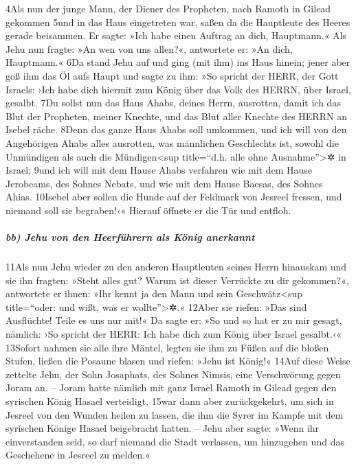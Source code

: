 4Als nun der junge Mann, der Diener des Propheten, nach Ramoth in Gilead
gekommen 5und in das Haus eingetreten war, saßen da die Hauptleute des
Heeres gerade beisammen. Er sagte: »Ich habe einen Auftrag an dich,
Hauptmann.« Als Jehu nun fragte: »An wen von uns allen?«, antwortete er:
»An dich, Hauptmann.« 6Da stand Jehu auf und ging (mit ihm) ins Haus
hinein; jener aber goß ihm das Öl aufs Haupt und sagte zu ihm: »So
spricht der HERR, der Gott Israels: ›Ich habe dich hiermit zum König
über das Volk des HERRN, über Israel, gesalbt. 7Du sollst nun das Haus
Ahabs, deines Herrn, ausrotten, damit ich das Blut der Propheten, meiner
Knechte, und das Blut aller Knechte des HERRN an Isebel räche. 8Denn das
ganze Haus Ahabs soll umkommen, und ich will von den Angehörigen Ahabs
alles ausrotten, was männlichen Geschlechts ist, sowohl die Unmündigen
als auch die Mündigen\textless sup title=``d.h. alle ohne
Ausnahme''\textgreater✲ in Israel; 9und ich will mit dem Hause Ahabs
verfahren wie mit dem Hause Jerobeams, des Sohnes Nebats, und wie mit
dem Hause Baesas, des Sohnes Ahias. 10Isebel aber sollen die Hunde auf
der Feldmark von Jesreel fressen, und niemand soll sie begraben!‹«
Hierauf öffnete er die Tür und entfloh.

\hypertarget{bb-jehu-von-den-heerfuxfchrern-als-kuxf6nig-anerkannt}{%
\subparagraph{bb) Jehu von den Heerführern als König
anerkannt}\label{bb-jehu-von-den-heerfuxfchrern-als-kuxf6nig-anerkannt}}

11Als nun Jehu wieder zu den anderen Hauptleuten seines Herrn hinauskam
und sie ihn fragten: »Steht alles gut? Warum ist dieser Verrückte zu dir
gekommen?«, antwortete er ihnen: »Ihr kennt ja den Mann und sein
Geschwätz\textless sup title=``oder: und wißt, was er
wollte''\textgreater✲.« 12Aber sie riefen: »Das sind Ausflüchte! Teile
es uns nur mit!« Da sagte er: »So und so hat er zu mir gesagt, nämlich:
›So spricht der HERR: Ich habe dich zum König über Israel gesalbt.‹«
13Sofort nahmen sie alle ihre Mäntel, legten sie ihm zu Füßen auf die
bloßen Stufen, ließen die Posaune blasen und riefen: »Jehu ist König!«
14Auf diese Weise zettelte Jehu, der Sohn Josaphats, des Sohnes Nimsis,
eine Verschwörung gegen Joram an. -- Joram hatte nämlich mit ganz Israel
Ramoth in Gilead gegen den syrischen König Hasael verteidigt, 15war dann
aber zurückgekehrt, um sich in Jesreel von den Wunden heilen zu lassen,
die ihm die Syrer im Kampfe mit dem syrischen Könige Hasael beigebracht
hatten. -- Jehu aber sagte: »Wenn ihr einverstanden seid, so darf
niemand die Stadt verlassen, um hinzugehen und das Geschehene in Jesreel
zu melden.«

